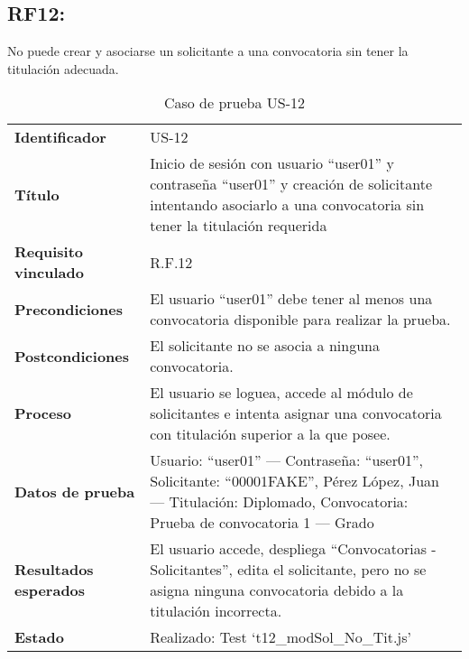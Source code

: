 \subsection*{RF12:} No puede crear y asociarse un solicitante a una convocatoria sin tener la titulación adecuada.
\begin{table}[H]
	\centering
	\small
	\caption{Caso de prueba US-12}
	\label{tab:caso_uso12}
	\begin{tabular}{>{\bfseries}l p{11cm}}
		Identificador & US-12 \\
		Título & Inicio de sesión con usuario “user01” y contraseña “user01” y creación de solicitante intentando asociarlo a una convocatoria sin tener la titulación requerida \\
		Requisito vinculado & R.F.12 \\
		Precondiciones & El usuario “user01” debe tener al menos una convocatoria disponible para realizar la prueba. \\
		Postcondiciones & El solicitante no se asocia a ninguna convocatoria. \\
		Proceso & El usuario se loguea, accede al módulo de solicitantes e intenta asignar una convocatoria con titulación superior a la que posee. \\
		Datos de prueba & Usuario: “user01” — Contraseña: “user01”, Solicitante: “00001FAKE”, Pérez López, Juan — Titulación: Diplomado, Convocatoria: Prueba de convocatoria 1 — Grado \\
		Resultados esperados & El usuario accede, despliega “Convocatorias - Solicitantes”, edita el solicitante, pero no se asigna ninguna convocatoria debido a la titulación incorrecta. \\
		Estado & Realizado: Test `t12\_modSol\_No\_Tit.js' \\
	\end{tabular}
\end{table}



